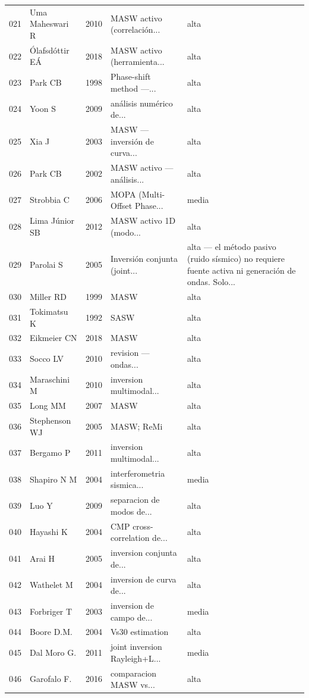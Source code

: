 \begin{longtable}{@{}p{0.9cm} p{3.5cm} p{0.9cm} p{3.4cm} p{6.4cm}@{}}
021 & Uma Maheswari R & 2010 & MASW activo (correlación... & alta \\
022 & Ólafsdóttir EÁ & 2018 & MASW activo (herramienta... & alta \\
023 & Park CB & 1998 & Phase-shift method ---... & alta \\
024 & Yoon S & 2009 & análisis numérico de... & alta \\
025 & Xia J & 2003 & MASW --- inversión de curva... & alta \\
026 & Park CB & 2002 & MASW activo --- análisis... & alta \\
027 & Strobbia C & 2006 & MOPA (Multi-Offset Phase... & media \\
028 & Lima Júnior SB & 2012 & MASW activo 1D (modo... & alta \\
029 & Parolai S & 2005 & Inversión conjunta (joint... & alta --- el método pasivo (ruido sísmico) no requiere fuente activa ni generación de ondas. Solo... \\
030 & Miller RD & 1999 & MASW & alta \\
031 & Tokimatsu K & 1992 & SASW & alta \\
032 & Eikmeier CN & 2018 & MASW & alta \\
033 & Socco LV & 2010 & revision --- ondas... & alta \\
034 & Maraschini M & 2010 & inversion multimodal... & alta \\
035 & Long MM & 2007 & MASW & alta \\
036 & Stephenson WJ & 2005 & MASW; ReMi & alta \\
037 & Bergamo P & 2011 & inversion multimodal... & alta \\
038 & Shapiro N M & 2004 & interferometria sismica... & media \\
039 & Luo Y & 2009 & separacion de modos de... & alta \\
040 & Hayashi K & 2004 & CMP cross-correlation de... & alta \\
041 & Arai H & 2005 & inversion conjunta de... & alta \\
042 & Wathelet M & 2004 & inversion de curva de... & alta \\
043 & Forbriger T & 2003 & inversion de campo de... & media \\
044 & Boore D.M. & 2004 & Vs30 estimation & alta \\
045 & Dal Moro G. & 2011 & joint inversion Rayleigh+L... & media \\
046 & Garofalo F. & 2016 & comparacion MASW vs... & alta \\

\end{longtable}
